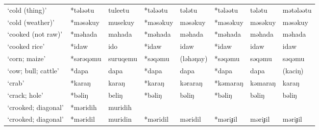 \begin{landscape}
\begin{longtable}[c]{@{}p{3cm}<{\raggedright}p{2.75cm}<{\raggedright}p{2.75cm}<{\raggedright}p{2.75cm}<{\raggedright}p{2.75cm}<{\raggedright}p{2.75cm}<{\raggedright}p{2.75cm}<{\raggedright}p{2.75cm}<{\raggedright}@{}}
`cold (thing)'                                       & *tələətu     & tuleetu                       & *tələətu       & tələtu                     & *tələətu         & tələtu                   & mətələətu                         \\
`cold (weather)'                                     & *məsəkuy     & musekuy                       & *məsəkuy       & məsəkuy                    & *məsəkuy         & məsəkuy                  & məsəkuy                           \\
`cooked (not raw)'                                   & *məhada      & mahada                        & *məhada        & məhada                     & *məhada          & məhada                   & məhada                            \\
`cooked rice'                                        & *idaw        & ido                           & *idaw          & idaw                       & *idaw            & idaw                     & idaw                              \\
`corn; maize'                                        & *sərəqəmu    & suruqemu                      & *səqəmu        & (ləhəŋay)                  & *səqəmu          & səqəmu                   & səqəmu                            \\
`cow; bull; cattle'                                  & *dapa        & dapa                          & *dapa          & dapa                       & *dapa            & dapa                     & (kaciŋ)                           \\
`crab'                                               & *karaŋ       & karaŋ                         & *karaŋ         & kəraraŋ                    & *kəmaraŋ         & kəmaraŋ                  & karaŋ                             \\
`crack; hole'                                        & *bəliŋ       & beliŋ                         & *bəliŋ         & bəliŋ                      & *bəliŋ           & bəliŋ                    & bəliŋ                             \\
`crooked; diagonal'                                  & *məridih     & muridih                       &                &                            &                  &                          &                                   \\
`crooked; diagonal'                                  & *məridil     & muridin                       & *məridil       & məridil                    & *məriɟil         & məriɟil                  & məriɟil                           \\

\end{longtable}
\end{landscape}
